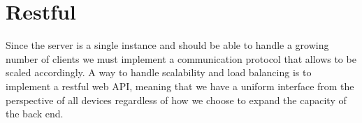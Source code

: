 
\section{Restful}

Since the server is a single instance and should be able to handle a growing number of clients we must implement a communication protocol that allows to be scaled accordingly. A way to handle scalability and load balancing is to implement a restful web API, meaning that we have a uniform interface from the perspective of all devices regardless of how we choose to expand the capacity of the back end. 

